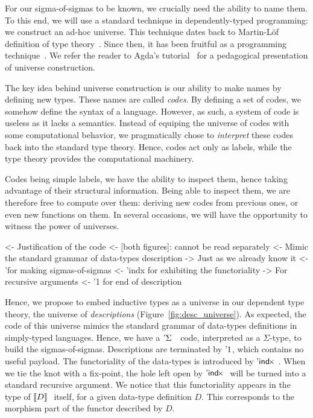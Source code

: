 
For our sigma-of-sigmas to be known, we crucially need the ability to
name them. To this end, we will use a standard technique in
dependently-typed programming: we construct an ad-hoc universe. This
technique dates back to Martin-L\"of definition of type
theory~\cite{martin-lof:itt}. Since then, it has been fruitful as a
programming technique~\cite{who?}. We refer the reader to Agda's
tutorial~\cite{norell:agda-tutorial} for a pedagogical presentation of
universe construction.

The key idea behind universe construction is our ability to make names
by defining new types. These names are called \emph{codes}. By
defining a set of codes, we somehow define the syntax of a
language. However, as such, a system of code is useless as it lacks a
semantics. Instead of equiping the universe of codes with some
computational behavior, we pragmatically chose to \emph{interpret}
these codes back into the standard type theory. Hence, codes act only
as labels, while the type theory provides the computational machinery.

Codes being simple labels, we have the ability to inspect them, hence
taking advantage of their structural information. Being able to
inspect them, we are therefore free to compute over them: deriving new
codes from previous ones, or even new functions on them. In several
occasions, we will have the opportunity to witness the power of
universes.

\begin{wstructure}
<- Justification of the code 
    <- [both figures]: cannot be read separately
    <- Mimic the standard grammar of data-types description
        -> Just as we already know it
        <- '\Sigma for making sigmas-of-sigmas
        <- 'indx for exhibiting the functoriality
            -> For recursive arguments
        <- '1 for end of description
\end{wstructure}

Hence, we propose to embed inductive types as a universe in our
dependent type theory, the universe of \emph{descriptions}
(Figure~\ref{fig:desc_universe}). As expected, the code of this
universe mimics the standard grammar of data-types definitions in
simply-typed languages. Hence, we have a $\DSigma{}{}$ code,
interpreted as a $\Sigma$-type, to build the
sigmas-of-sigmas. Descriptions are terminated by $\DUnit$, which
contains no useful payload. The functoriality of the data-types is
introduced by $\DIndx$. When we tie the knot with a fix-point, the
hole left open by $\DIndx$ will be turned into a standard recursive
argument. We notice that this functoriality appears in the type of
$\descop{D}{}$ itself, for a given data-type definition $D$. This
corresponds to the morphism part of the functor described by $D$.


